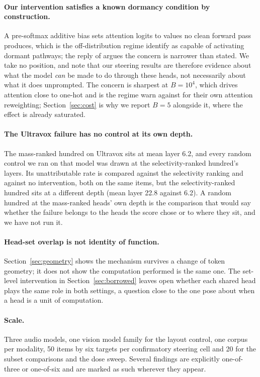 \documentclass[11pt]{article}
\begin{document}
\paragraph{Our intervention satisfies a known dormancy condition by
construction.} A pre-softmax additive bias sets attention logits to values no
clean forward pass produces, which is the off-distribution regime
\citet{makelov2024illusion} identify as capable of activating dormant pathways;
the reply of \citet{wu2024rebuttal} argues the concern is narrower than stated. We
take no position, and note that our steering results are therefore evidence about
what the model \emph{can} be made to do through these heads, not necessarily
about what it does unprompted. The concern is sharpest at $B{=}10^4$, which drives
attention close to one-hot and is the regime \citet{zhang2024pasta} warn against
for their own attention reweighting; Section~\ref{sec:cost} is why we report
$B{=}5$ alongside it, where the effect is already saturated.

\paragraph{The Ultravox failure has no control at its own depth.} The mass-ranked
hundred on Ultravox sits at mean layer 6.2, and every random control we ran on
that model was drawn at the selectivity-ranked hundred's layers. Its
unattributable rate is compared against the selectivity ranking and against no
intervention, both on the same items, but the selectivity-ranked hundred sits at
a different depth (mean layer 22.8 against 6.2). A random hundred at the mass-ranked heads' own
depth is the comparison that would say whether the failure belongs to the heads
the score chose or to where they sit, and we have not run it.

\paragraph{Head-set overlap is not identity of function.}
Section~\ref{sec:geometry} shows the mechanism survives a change of token
geometry; it does not show the computation performed is the same one. The
set-level intervention in Section~\ref{sec:borrowed} leaves open whether each
shared head plays the same role in both settings, a question close to the one
\citet{computationalunit2026} pose about when a head is a unit of computation.

\paragraph{Scale.} Three audio models, one vision model family for the layout
control, one corpus per modality, 50 items by six targets per confirmatory
steering cell and 20 for the subset comparisons and the dose sweep. Several
findings are explicitly one-of-three or one-of-six and are marked as such
wherever they appear.
\end{document}
